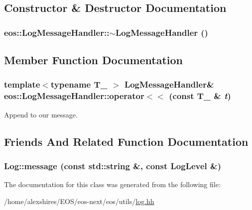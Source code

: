 \subsection{Constructor \& Destructor Documentation}
\hypertarget{classeos_1_1LogMessageHandler_aad1be08a8a665dea99f4dd08a18c8e1f}{
\subsubsection[{$\sim$LogMessageHandler}]{\setlength{\rightskip}{0pt plus 5cm}eos::LogMessageHandler::$\sim$LogMessageHandler ()}}
\label{classeos_1_1LogMessageHandler_aad1be08a8a665dea99f4dd08a18c8e1f}


\subsection{Member Function Documentation}
\hypertarget{classeos_1_1LogMessageHandler_a9e80fc226b5a9e496b4458f4dcac8edf}{
\subsubsection[{operator$<$$<$}]{\setlength{\rightskip}{0pt plus 5cm}template$<$typename T\_\- $>$ {\bf LogMessageHandler}\& eos::LogMessageHandler::operator$<$$<$ (const T\_\- \& {\em t})}}
\label{classeos_1_1LogMessageHandler_a9e80fc226b5a9e496b4458f4dcac8edf}
Append to our message. 

\subsection{Friends And Related Function Documentation}
\hypertarget{classeos_1_1LogMessageHandler_a9c07080df7f9a92cc12bc4572a1353ca}{
\subsubsection[{Log::message}]{ Log::message (const std::string \&, \/  const {\bf LogLevel} \&)}}
\label{classeos_1_1LogMessageHandler_a9c07080df7f9a92cc12bc4572a1353ca}


The documentation for this class was generated from the following file:\begin{DoxyCompactItemize}
\item 
/home/alexshires/EOS/eos-\/next/eos/utils/\hyperlink{log_8hh}{log.hh}\end{DoxyCompactItemize}
